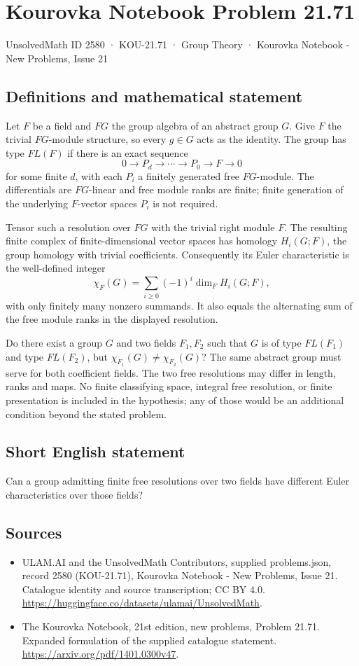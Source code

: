 \documentclass[11pt,a4paper]{article}
\begin{document}
\section*{Kourovka Notebook Problem 21.71}\label{2580}
{\small UnsolvedMath ID 2580 · KOU-21.71 · Group Theory · Kourovka Notebook - New Problems, Issue 21}
\subsection{Definitions and mathematical statement}
Let $F$ be a field and $FG$ the group algebra of an abstract group
$G$. Give $F$ the trivial $FG$-module structure, so every $g\in G$
acts as the identity. The group has type $FL(F)$ if there is an exact
sequence
\[
 0\longrightarrow P_d\longrightarrow\cdots\longrightarrow P_0
 \longrightarrow F\longrightarrow0
\]
for some finite $d$, with each $P_i$ a finitely generated free
$FG$-module. The differentials are $FG$-linear and free module ranks
are finite; finite generation of the underlying $F$-vector spaces
$P_i$ is not required.

Tensor such a resolution over $FG$ with the trivial right module $F$.
The resulting finite complex of finite-dimensional vector spaces has
homology $H_i(G;F)$, the group homology with trivial coefficients.
Consequently its Euler characteristic is the well-defined integer
\[
 \chi_F(G)=\sum_{i\ge0}(-1)^i\dim_F H_i(G;F),
\]
with only finitely many nonzero summands. It also equals the alternating
sum of the free module ranks in the displayed resolution.

Do there exist a group $G$ and two fields $F_1,F_2$ such that $G$ is
of type $FL(F_1)$ and type $FL(F_2)$, but
$\chi_{F_1}(G)\ne\chi_{F_2}(G)$?
The same abstract group must serve for both coefficient fields.
The two free resolutions may differ in length, ranks and maps.
No finite classifying space, integral free resolution, or finite
presentation is included in the hypothesis; any of those would be
an additional condition beyond the stated problem.
\subsection{Short English statement}
Can a group admitting finite free resolutions over two fields have different Euler characteristics over those fields?
\subsection{Sources}
\begin{itemize}
\item[S1] ULAM.AI and the UnsolvedMath Contributors, supplied problems.json, record 2580 (KOU-21.71), Kourovka Notebook - New Problems, Issue 21. Catalogue identity and source transcription; CC BY 4.0.
\url{https://huggingface.co/datasets/ulamai/UnsolvedMath}.
\item[S2] The Kourovka Notebook, 21st edition, new problems, Problem 21.71. Expanded formulation of the supplied catalogue statement.
\url{https://arxiv.org/pdf/1401.0300v47}.
\end{itemize}
\end{document}
